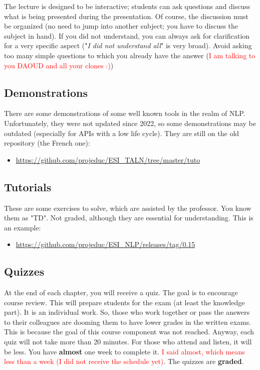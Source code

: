 \documentclass[11pt, a4paper]{article}
\begin{document}
The lecture is designed to be interactive; students can ask questions and discuss what is being presented during the presentation. 
Of course, the discussion must be organized (no need to jump into another subject; you have to discuss the subject in hand).
If you did not understand, you can always ask for clarification for a very specific aspect ("\textit{I did not understand all}" is very broad). 
Avoid asking too many simple questions to which you already have the answer (\textcolor{red}{I am talking to you DAOUD and all your clones :)})

\subsection{Demonstrations}

There are some demonstrations of some well known tools in the realm of NLP. 
Unfortunately, they were not updated since 2022, so some demonstrations may be outdated (especially for APIs with a low life cycle).
They are still on the old repository (the French one):
\begin{itemize}
	\item \url{https://github.com/projeduc/ESI_TALN/tree/master/tuto}
\end{itemize}

\subsection{Tutorials}

These are some exercises to solve, which are assisted by the professor.
You know them as "TD". 
Not graded, although they are essential for understanding.
This is an example:
\begin{itemize}
	\item \url{https://github.com/projeduc/ESI_NLP/releases/tag/0.15}
\end{itemize}

\subsection{Quizzes}

At the end of each chapter, you will receive a quiz.
The goal is to encourage course review. 
This will prepare students for the exam (at least the knowledge part).
It is an individual work.
So, those who work together or pass the answers to their colleagues are dooming them to have lower grades in the written exams.
This is because the goal of this course component was not reached.
%
Anyway, each quiz will not take more than 20 minutes.
For those who attend and listen, it will be less.
You have \textbf{almost} one week to complete it. 
\textcolor{red}{I said almost, which means less than a week (I did not receive the schedule yet)}.
The quizzes are \textbf{graded}.
\end{document}

